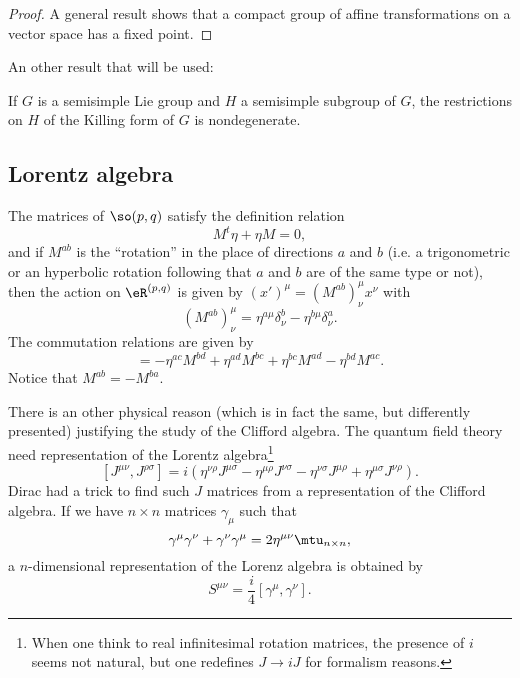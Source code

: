 \begin{proof}
	A general result shows that a compact group of affine transformations on a vector space has a fixed point.

\end{proof}

An other result that will be used:
\begin{lemma}		\label{lem:Killing_ss_descent}
	If $G$ is a semisimple Lie group and $H$ a semisimple subgroup of $G$, the restrictions on $H$ of the Killing form of $G$ is nondegenerate.
\end{lemma}

\subsection{Lorentz algebra}

\begin{lemma}     \label{LemCommsopqAlg}
	The matrices of $\so(p,q)$ satisfy the definition relation
	\begin{equation}
		M^t\eta+\eta M=0,
	\end{equation}
	and if $M^{ab}$ is the ``rotation'' in the place of directions $a$ and $b$ (i.e. a trigonometric or an hyperbolic rotation following that $a$ and $b$ are of the same type or not), then the action on $\eR^{(p,q)}$ is given by $(x')^{\mu}=(M^{ab})^{\mu}_{\nu}x^{\nu}$ with
	\begin{equation}
		(M^{ab})^{\mu}_{\nu}=\eta^{a\mu}\delta^b_{\nu}-\eta^{b\mu}\delta^a_{\nu}.
	\end{equation}
	The commutation relations are given by
	\begin{equation}
		[M^{ab},M^{cd}]=-\eta^{ac}M^{bd}+\eta^{ad}M^{bc}+\eta^{bc}M^{ad}-\eta^{bd}M^{ac}.
	\end{equation}
	Notice that $M^{ab}=-M^{ba}$.
\end{lemma}

There is an other physical reason (which is in fact the same, but differently presented) justifying the study of the Clifford algebra. The quantum field theory need representation of the Lorentz algebra\footnote{When one think to real infinitesimal rotation matrices, the presence of $i$ seems not natural, but one redefines $J\to iJ$ for formalism reasons.}
\[
	[J^{\mu\nu},J^{\rho\sigma}]=i(\eta^{\nu\rho}J^{\mu\sigma}-\eta^{\mu\rho}J^{\nu\sigma}
	-\eta^{\nu\sigma}J^{\mu\rho}+\eta^{\mu\sigma}J^{\nu\rho}).
\]
Dirac had a trick to find such $J$ matrices from a representation of the Clifford algebra. If we have $n\times n$ matrices $\gamma_{\mu}$ such that
\[
	\gamma^{\mu}\gamma^{\nu}+\gamma^{\nu}\gamma^{\mu}=2\eta^{\mu\nu}\mtu_{n\times n},
\]
a $n$-dimensional representation of the Lorenz algebra is obtained by
\[
	S^{\mu\nu}=\frac{i}{4}\left[\gamma^{\mu},\gamma^{\nu}\right].
\]

